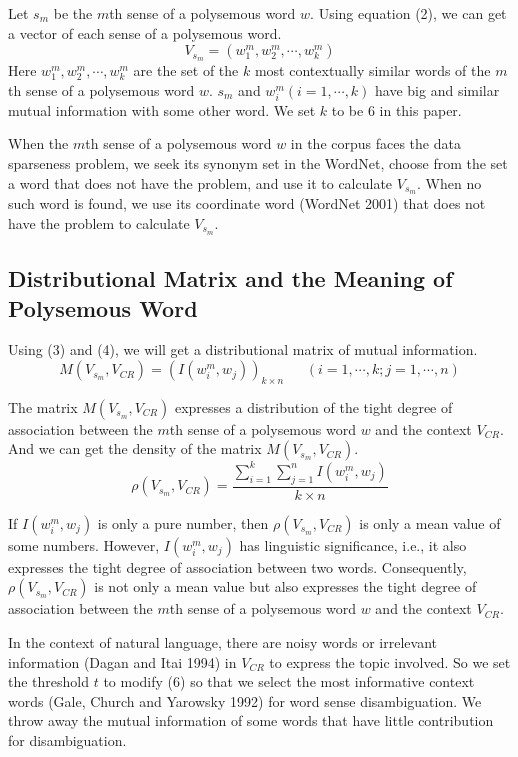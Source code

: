 Let $s_m$ be the $m$th sense of a polysemous word $w$.  Using equation (2), we 
can get a vector of each sense of a polysemous word. 
\begin{equation}
V_{s_m}=(w_1^m, w_2^m, \cdots, w_k^m)
\end{equation}
Here $w_1^m, w_2^m, \cdots, w_k^m$ are the set of the $k$ most contextually similar words of
 the $m$th sense of a polysemous word $w$.  $s_m$ and $w_i^m (i=1, \cdots, k)$  have big and 
similar mutual information with some other word.  We set $k$ to be 6 in this paper.

When the $m$th sense of a polysemous word $w$ in the corpus faces the data 
sparseness problem, we seek its synonym set in the WordNet, choose from the 
set a word that does not have the problem, and use it to calculate $V_{s_m}$.  When 
no such word is found, we use its coordinate word (WordNet 2001) that does not have 
the problem to calculate $V_{s_m}$.

\subsection{Distributional Matrix and the Meaning of Polysemous Word}

Using (3) and (4), we will get a distributional matrix of mutual information.
\begin{equation}
M(V_{s_m}, V_{CR})=(I(w_i^m, w_j))_{k \times n}~~~~~~~  (i=1, \cdots, k; j=1, \cdots, n)
\end{equation}

The matrix $M(V_{s_m}, V_{CR})$ expresses a distribution of the tight degree of association
 between the $m$th sense of a polysemous word $w$ and the context $V_{CR}$.  And we 
can get the density of the matrix $M(V_{s_m}, V_{CR})$.
\begin{equation}
\rho (V_{s_m}, V_{CR})=\frac{\sum_{i=1}^k \sum_{j=1}^n I(w_i^m, w_j)}{k \times n}
\end{equation}

If $I(w_i^m, w_j)$ is only a pure number, then $\rho (V_{s_m}, V_{CR})$ is 
only a mean value of some numbers.  However, $I(w_i^m, w_j)$ has linguistic significance,
 i.e., it also expresses the tight degree of association between two words.  
Consequently, $\rho (V_{s_m}, V_{CR})$ is not only a mean 
value but also expresses the tight degree of association between the $m$th sense 
of a polysemous word $w$ and the context $V_{CR}$.

In the context of natural language, there are noisy words or irrelevant
 information (Dagan and Itai 1994) in $V_{CR}$ to express the topic involved.  So we set the 
threshold $t$ to modify (6) so that we select the most informative context
 words (Gale, Church and Yarowsky 1992) for word sense disambiguation.  We 
throw away the mutual information
 of some words that have little contribution for disambiguation.

